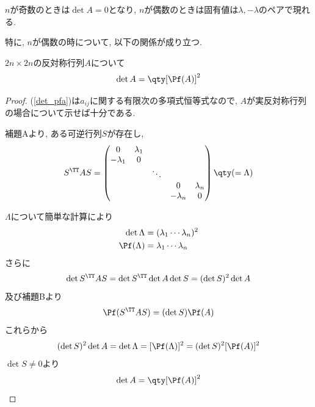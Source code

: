 \documentclass[a4paper,12pt]{jlreq}
\begin{document}
$n$が奇数のときは$\det A=0$となり, $n$が偶数のときは固有値は$\lambda, -\lambda$のペアで現れる.

特に, $n$が偶数の時について, 以下の関係が成り立つ.
\begin{theotcolorbox}[title = 行列式とPfaffianの関係]
    $2n\times 2n$の反対称行列$A$について
    \begin{equation}
        \label{det_pfa}
        \det A = \qty[ \Pf (A) ]^2
    \end{equation}
\end{theotcolorbox}

\begin{proof}
    (\ref{det_pfa})は$a_{ij}$に関する有限次の多項式恒等式なので, $A$が実反対称行列の場合について示せば十分である.

    補題Aより, ある可逆行列$S$が存在し,
    \begin{equation}
        S^{\TT}AS = \begin{pmatrix}
            0 & \lambda_1 & & & \\
            -\lambda_1 & 0 & & & \\
             & & \ddots & & \\
            & & & 0 & \lambda_n \\
            & & & -\lambda_n & 0
        \end{pmatrix}
        \qty( = \Lambda )
    \end{equation}

    $\Lambda$について簡単な計算により
    \begin{align}
        \det \Lambda    & = (\lambda_1 \cdots \lambda_n)^2\\
        \Pf (\Lambda)   & = \lambda_1 \cdots \lambda_n
    \end{align}
    さらに
    \begin{equation}
        \det S^{\TT}AS = \det S^{\TT} \det A \det S = (\det S)^2 \det A
    \end{equation}
    及び補題Bより
    \begin{equation}
        \Pf (S^{\TT}AS) = (\det S) \Pf (A)
    \end{equation}
    これらから
    \begin{align}
        (\det S)^2 \det A = \det \Lambda = [\Pf (\Lambda)]^2 = (\det S)^2 [\Pf (A)]^2
    \end{align}
    $\det S \neq 0$より
    \begin{equation}
        \det A = \qty[ \Pf (A) ]^2
    \end{equation}
\end{proof}
\end{document}
